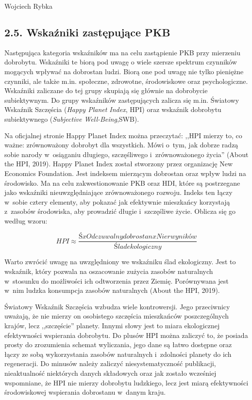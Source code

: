 \begin{artplenv}{Wojciech Rybka}
\subsection{2.5. Wskaźniki zastępujące PKB}
Następująca kategoria wskaźników ma na celu zastąpienie PKB przy mierzeniu dobrobytu. Wskaźniki te biorą pod uwagę o
wiele szersze spektrum czynników mogących wpływać na dobrostan ludzi. Biorą one pod uwagę nie tylko pieniężne czynniki,
ale także m.in. społeczne, zdrowotne, środowiskowe oraz psychologiczne. Wskaźniki zaliczane do tej grupy skupiają się
głównie na dobrobycie subiektywnym. Do grupy wskaźników zastępujących zalicza się m.in. Światowy Wskaźnik Szczęścia
(\textit{Happy Planet Index}, HPI) oraz wskaźnik dobrobytu subiektywnego (\textit{Subjective Well-Being},SWB).

Na oficjalnej stronie Happy Planet Index można przeczytać: ,,HPI mierzy to, co ważne: zrównoważony dobrobyt dla
wszystkich. Mówi o~tym, jak dobrze radzą sobie narody w~osiąganiu długiego, szczęśliwego i~zrównoważonego życia''
\label{ref:RND5EjiqveQ3W}(About the HPI, 2019). Happy Planet Index został stworzony przez organizację New Economics
Foundation. Jest indeksem mierzącym dobrostan oraz wpływ ludzi na środowisko. Ma na celu zakwestionowanie PKB oraz HDI,
które są postrzegane jako wskaźniki nieuwzględniające zrównoważonego rozwoju. Indeks ten łączy w~sobie cztery elementy,
aby pokazać jak efektywnie mieszkańcy korzystają z~zasobów środowiska, aby prowadzić długie i~szczęśliwe życie. Oblicza
się go według wzoru:

\begin{equation*}
\mathit{HPI}{\approx}\frac{\mathit{Ś}x\mathit{Odczuwalny dobrostan}x\mathit{Nier wyników}}{\mathit{Ślad ekologiczny}}
\end{equation*}

Warto zwrócić uwagę na uwzględniony we wskaźniku ślad ekologiczny. Jest to wskaźnik, który pozwala na oszacowanie
zużycia zasobów naturalnych w~stosunku do możliwości ich odtworzenia przez Ziemię. Porównywana jest w~nim ludzka
konsumpcja zasobów naturalnych \label{ref:RNDvhQx0fQ1FK}(About the HPI, 2019).

Światowy Wskaźnik Szczęścia wzbudza wiele kontrowersji. Jego przeciwnicy uważają, że nie mierzy on osobistego szczęścia
mieszkańców poszczególnych krajów, lecz ,,szczęście'' planety. Innymi słowy jest to miara ekologicznej efektywności
wspierania dobrobytu. Do plusów HPI można zaliczyć to, że posiada prosty do zrozumienia schemat wyliczania, jego dane
są łatwo dostępne oraz łączy ze sobą wykorzystania zasobów naturalnych i~zdolności planety do ich regeneracji. Do
minusów należy zaliczyć niesystematyczność publikacji, nieaktualność niektórych danych składowych oraz jak zostało
wcześniej wspomniane, że HPI nie mierzy dobrobytu ludzkiego, lecz jest miarą efektywności środowiskowej wspierania
dobrostanu w~danym kraju. 


\end{artplenv}
